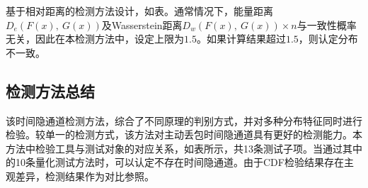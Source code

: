 
基于相对距离的检测方法设计，如表。通常情况下，能量距离$D_{e}(F(x),\ G(x))$及Wasserstein距离$D_{w}(F(x),\ G(x))\times n$与一致性概率无关，因此在本检测方法中，设定上限为$1.5$。如果计算结果超过$1.5$，则认定分布不一致。

\subsection{检测方法总结}
\label{chap:analyze:statistical:sum}
该时间隐通道检测方法，综合了不同原理的判别方式，并对多种分布特征同时进行检验。较单一的检测方式，该方法对主动丢包时间隐通道具有更好的检测能力。本方法中检验工具与测试对象的对应关系，如表所示，共13条测试子项。当通过其中的10条量化测试方法时，可以认定不存在时间隐通道。由于CDF检验结果存在主观差异，检测结果作为对比参照。

